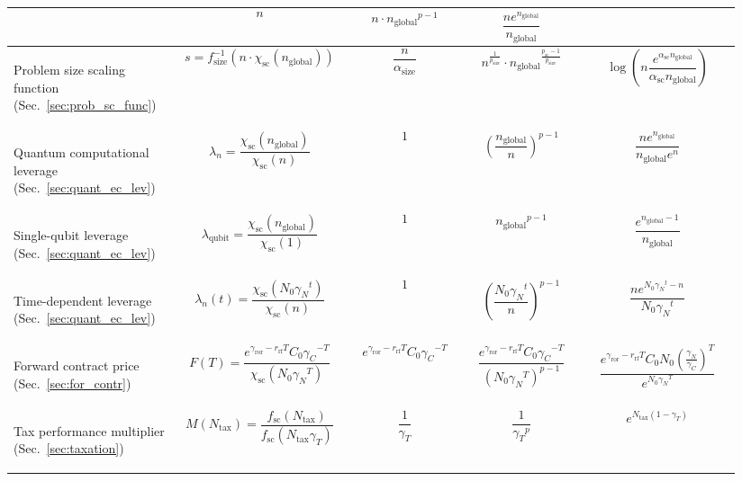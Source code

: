 \begin{table}[!htb]
\begin{tabular}{|m{0.21\linewidth}|m{0.22\linewidth}|m{0.155\linewidth}|m{0.155\linewidth}|m{0.2\linewidth}|}
\[\] & \[n\] & \[n\cdot{n_\text{global}}^{p-1}\] & \[\frac{n e^{n_\text{global}}}{n_\text{global}}\]\\
	\hline
	\begin{flushleft}Problem size scaling function (Sec.~\ref{sec:prob_sc_func})\end{flushleft} & \[s = f_\text{size}^{-1}(n\cdot \chi_\text{sc}(n_\text{global}))\] & \[\frac{n}{\alpha_\text{size}}\] & \[n^{\frac{1}{p_\text{size}}} \cdot {n_\text{global}}^\frac{p_\text{sc}-1}{p_\text{size}}\] & \[\log\left(n \frac{e^{\alpha_\text{sc}n_\text{global}}}{\alpha_\text{sc}n_\text{global}}\right)\]\\
	\hline
	\begin{flushleft}Quantum computational leverage (Sec.~\ref{sec:quant_ec_lev})\end{flushleft} & \[\lambda_n=\frac{\chi_\text{sc}(n_\text{global})}{\chi_\text{sc}(n)}\] & \[1\] & \[\left(\frac{n_\text{global}}{n}\right)^{p-1}\] & \[\frac{n e^{n_\text{global}}}{n_\text{global}e^n}\]\\
	\hline
	\begin{flushleft}Single-qubit leverage (Sec.~\ref{sec:quant_ec_lev})\end{flushleft} & \[\lambda_\text{qubit}=\frac{\chi_\text{sc}(n_\text{global})}{\chi_\text{sc}(1)}\] & \[1\] & \[{n_\text{global}}^{p-1}\] & \[\frac{e^{n_\text{global}-1}}{n_\text{global}}\]\\
	\hline
	\begin{flushleft}Time-dependent leverage (Sec.~\ref{sec:quant_ec_lev})\end{flushleft} & \[\lambda_n(t)=\frac{\chi_\text{sc}(N_0{\gamma_N}^t)}{\chi_\text{sc}(n)}\] &  \[1\] & \[\left(\frac{N_0{\gamma_N}^t}{n}\right)^{p-1}\] & \[\frac{n e^{N_0{\gamma_N}^t-n}}{N_0{\gamma_N}^t}\]\\
	\hline
	\begin{flushleft}Forward contract price (Sec.~\ref{sec:for_contr})\end{flushleft} & \[F(T)=\frac{e^{\gamma_\text{ror}-r_\text{rf}T} C_0{\gamma_C}^{-T}}{\chi_\text{sc}(N_0 {\gamma_N}^T)}\]
 & \[e^{\gamma_\text{ror}-r_\text{rf}T} C_0{\gamma_C}^{-T}\] & \[\frac{e^{\gamma_\text{ror}-r_\text{rf}T} C_0{\gamma_C}^{-T}}{(N_0 {\gamma_N}^T)^{p-1}}\] & \[\frac{e^{\gamma_\text{ror}-r_\text{rf}T} C_0N_0\left(\frac{\gamma_N}{\gamma_C}\right)^T}{e^{N_0 {\gamma_N}^T}}\] \\
	\hline
	\begin{flushleft}Tax performance multiplier (Sec.~\ref{sec:taxation})\end{flushleft} & \[M(N_\text{tax})=\frac{f_\text{sc}(N_\text{tax})}{f_\text{sc}(N_\text{tax} \gamma_T)}\] & \[\frac{1}{\gamma_T}\] & \[\frac{1}{{\gamma_T}^p}\] & \[e^{N_\text{tax}(1-\gamma_T)}\]\\

\end{tabular}
\end{table}
